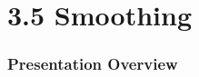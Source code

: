 \documentclass[13.5pt,aspecratio=169]{beamer}
\begin{document}

\section{3.5 Smoothing} %
\begin{frame}
	\frametitle{Presentation Overview} %
	\tableofcontents[currentsection]
\end{frame}

\end{document}
